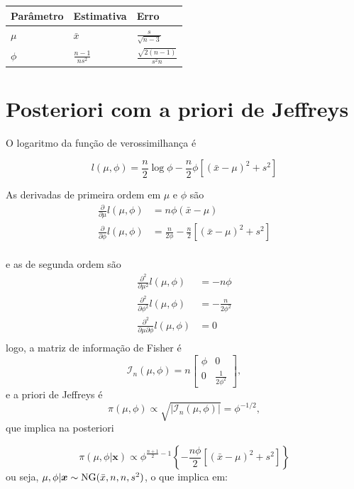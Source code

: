 \documentclass[
  letterpaper,
  DIV=11,
  numbers=noendperiod]{scrreprt}
\theoremstyle{definition}
\theoremstyle{definition}
\theoremstyle{plain}
\theoremstyle{remark}
\begin{document}
\begin{longtable}[]{@{}lll@{}}
\toprule\noalign{}
Parâmetro & Estimativa & Erro \\
\midrule\noalign{}
\endhead
\bottomrule\noalign{}
\endlastfoot
\(\mu\) & \(\bar{x}\) & \(\frac{s}{\sqrt{n-3}}\) \\
\(\phi\) & \(\frac{n-1}{ns^2}\) & \(\frac{\sqrt{2(n-1)}}{s^2n}\) \\
\end{longtable}

\section{Posteriori com a priori de
Jeffreys}\label{posteriori-com-a-priori-de-jeffreys}

O logaritmo da função de verossimilhança é

\[l(\mu,\phi)=\frac{n}{2}\log\phi -\frac{n}{2}\phi\left[(\bar{x}-\mu)^2 + s^2\right]\]

As derivadas de primeira ordem em \(\mu\) e \(\phi\) são \[\begin{align}
\frac{\partial}{\partial \mu}l(\mu,\phi)&=n\phi(\bar{x}-\mu)\\
\frac{\partial}{\partial \phi}l(\mu,\phi)&=\frac{n}{2\phi}-\frac{n}{2}\left[(\bar{x}-\mu)^2 + s^2\right]\\
\end{align}\]

e as de segunda ordem são \[\begin{align}
\frac{\partial^2}{\partial \mu^2}l(\mu,\phi)&=-n\phi\\
\frac{\partial^2}{\partial \phi^2}l(\mu,\phi)&=-\frac{n}{2\phi^2}\\
\frac{\partial^2}{\partial \mu\partial \phi}l(\mu,\phi)&=0\\
\end{align}
\] logo, a matriz de informação de Fisher é
\[\mathcal{I}_n(\mu,\phi)=n\left[\begin{array}{cc}\phi & 0 \\0 & \frac{1}{2\phi^2}\end{array}\right],\]
e a priori de Jeffreys é
\[\pi(\mu,\phi)\propto \sqrt{|\mathcal{I}_n(\mu,\phi)|}=\phi^{-1/2},\]
que implica na posteriori

\[\pi(\mu,\phi|\boldsymbol{x})\propto \phi^{\frac{n+1}{2}-1}\left\{-\frac{n\phi}{2}\left[(\bar{x}-\mu)^2 +s^2 \right]\right\}\]
ou seja, \(\mu,\phi|\boldsymbol{x}\sim\hbox{NG}(\bar{x},n,n,s^2)\), o
que implica em:
\end{document}
